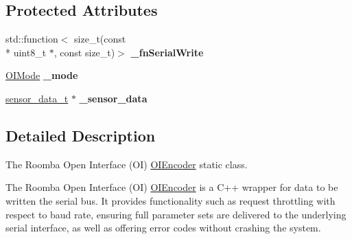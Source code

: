 \subsection*{Protected Attributes}
\begin{DoxyCompactItemize}
\item 
\hypertarget{classroomba_1_1series500_1_1oi_1_1_o_i_encoder_adea2ff25939589efd18d0ae64b14049b}{std\+::function$<$ size\+\_\+t(const \\*
uint8\+\_\+t $\ast$, const size\+\_\+t)$>$ {\bfseries \+\_\+fn\+Serial\+Write}}\label{classroomba_1_1series500_1_1oi_1_1_o_i_encoder_adea2ff25939589efd18d0ae64b14049b}

\item 
\hypertarget{classroomba_1_1series500_1_1oi_1_1_o_i_encoder_ad32c2523ae60429c8e3cd20e11414de8}{\hyperlink{namespaceroomba_1_1series500_1_1oi_a8dde6b4ac23e862ae50868c3963d7063}{O\+I\+Mode} {\bfseries \+\_\+mode}}\label{classroomba_1_1series500_1_1oi_1_1_o_i_encoder_ad32c2523ae60429c8e3cd20e11414de8}

\item 
\hypertarget{classroomba_1_1series500_1_1oi_1_1_o_i_encoder_aeaf8bdbc3ee35ac20da50619cfaddd86}{\hyperlink{classroomba_1_1series500_1_1oi_1_1_o_i_encoder_a19ddaf411fb6201dde68dd359932992b}{sensor\+\_\+data\+\_\+t} $\ast$ {\bfseries \+\_\+sensor\+\_\+data}}\label{classroomba_1_1series500_1_1oi_1_1_o_i_encoder_aeaf8bdbc3ee35ac20da50619cfaddd86}

\end{DoxyCompactItemize}


\subsection{Detailed Description}
The Roomba Open Interface (O\+I) \hyperlink{classroomba_1_1series500_1_1oi_1_1_o_i_encoder}{O\+I\+Encoder} static class. 

The Roomba Open Interface (O\+I) \hyperlink{classroomba_1_1series500_1_1oi_1_1_o_i_encoder}{O\+I\+Encoder} is a C++ wrapper for data to be written the serial bus. It provides functionality such as request throttling with respect to baud rate, ensuring full parameter sets are delivered to the underlying serial interface, as well as offering error codes without crashing the system. 

